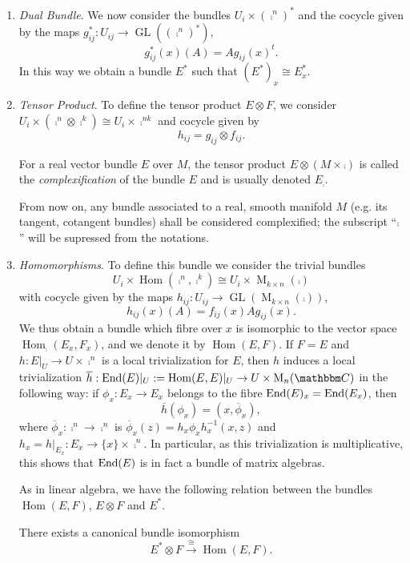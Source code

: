 \begin{enumerate}
\item \emph{Dual Bundle}. We now consider the bundles
  $U_i\times (\comp^n)^*$ and the cocycle given by the maps
  $g_{ij}^*:U_{ij}\to \operatorname{GL}((\comp^n)^*)$,
$$g^*_{ij}(x)(A)=Ag_{ij}(x)^t.$$
In this way we obtain a bundle $E^*$ such that $(E^*)_x\cong E_x^*$.

\item \emph{Tensor Product}. To define the tensor product
  $E\otimes F$, we consider
  $U_i\times (\comp^n\otimes \comp^k)\cong U_i\times \comp^{nk}$ and
  cocycle given by
$$h_{ij}=g_{ij}\otimes f_{ij}.$$

For a real vector bundle $E$ over $M$, the tensor product
$E\otimes (M\times \comp )$ is called the \emph{complexification} of
the bundle $E$ and is usually denoted $E_\comp$.

\begin{obs}
  From now on, any bundle associated to a real, smooth manifold $M$
  (e.g. its tangent, cotangent bundles) shall be considered
  complexified; the subscript ``$\comp$'' will be supressed from the
  notations.
\end{obs}

\item \emph{Homomorphisms}. To define this bundle we consider the
  trivial bundles
$$U_i\times \operatorname{Hom}(\comp^n,\comp^k)\cong U_i\times \operatorname{M}_{k\times n}(\comp )$$
with cocycle given by the maps
$h_{ij}:U_{ij}\to \operatorname{GL}(\operatorname{M}_{k\times n}(\comp
))$,
$$h_{ij}(x)(A)=f_{ij}(x)Ag_{ij}(x).$$
We thus obtain a bundle which fibre over $x$ is isomorphic to the
vector space $\operatorname{Hom}_\comp (E_x,F_x)$, and we denote it by
$\operatorname{Hom}(E,F)$. If $F=E$ and $h:E|_U\to U\times \comp^n$ is
a local trivialization for $E$, then $h$ induces a local
trivialization
$\overline{h}:\opnm{End}(E)|_U:=\opnm{Hom}(E,E)|_U\to U\times
\opnm{M}_n(\comp)$ in the following way: if $\phi_x:E_x\to E_x$
belongs to the fibre $\operatorname{End}(E)_x=\operatorname{End}(E_x)$, then
$$\overline{h}(\phi_x)=(x,\overline{\phi}_x),$$
where $\overline{\phi}_x:\comp^n\to \comp^n$ is
$\overline{\phi}_x(z)=h_x\phi_xh_x^{-1}(x,z)$ and
$h_x=h|_{E_x}:E_x\to \{x\}\times \comp^n$. In particular, as this
trivialization is multiplicative, this shows that $\operatorname{End}(E)$ is
in fact a bundle of matrix algebras.

As in linear algebra, we have the following relation between the
bundles $\operatorname{Hom}(E,F)$, $E\otimes F$ and $E^*$.

\begin{proposition}
  There exists a canonical bundle isomorphism
$$E^*\otimes F\stackrel{\cong}{\longrightarrow}\operatorname{Hom}(E,F).$$
\end{proposition}


\end{enumerate}

